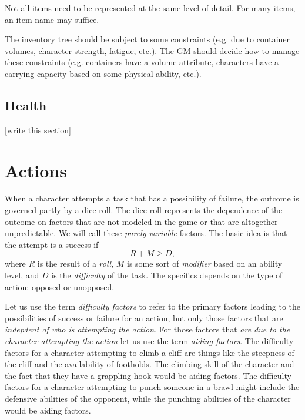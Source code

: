 \documentclass[12pt]{article}
\newcommand{\notes}[1]{{\color{Tan} #1}}
\begin{document}
Not all items need to be represented at the same level of detail.
For many items, an item name may suffice.

The inventory tree should be subject to some constraints
(e.g. due to container volumes, character strength, fatigue, etc.).
The GM should decide how to manage these constraints
(e.g. containers have a volume attribute, characters have a carrying capacity based on some physical ability, etc.).

\subsection{Health} \label{sec:health}

\notes{[write this section]}


\section{Actions}\label{sec:actions}
When a character attempts a task that has a possibility of failure, the outcome is governed partly by a dice roll.
The dice roll represents the dependence of the outcome on factors that are not modeled in the game or that are altogether unpredictable.
We will call these \emph{purely variable} factors.
The basic idea is that the attempt is a success if
$$ R + M \geq D, $$
where $R$ is the result of a \emph{roll}, $M$ is some sort of \emph{modifier} based on an ability level,
and $D$ is the \emph{difficulty} of the task.
The specifics depends on the type of action: opposed or unopposed.



Let us use the term \emph{difficulty factors} to refer to
the primary factors leading to the possibilities of success or failure for an action,
but only those factors that are \emph{indepdent of who is attempting the action}.
For those factors that \emph{are due to the character attempting the action} let us use the term \emph{aiding factors}.
The difficulty factors for a character attempting to climb a cliff are things
like the steepness of the cliff and the availability of footholds.
The climbing skill of the character and the fact that they have a grappling hook would be aiding factors.
The difficulty factors for a character attempting to punch someone in a brawl might include the defensive abilities of the opponent,
while the punching abilities of the character would be aiding factors.
\end{document}
